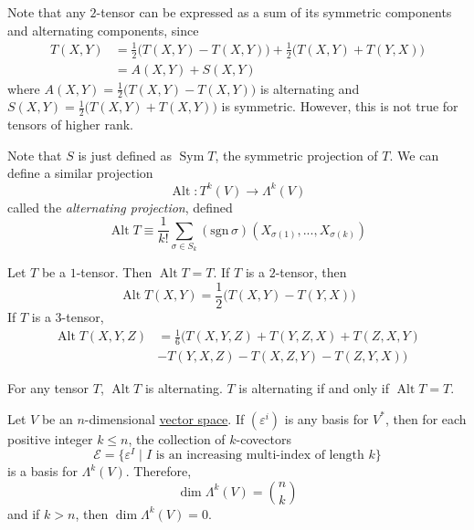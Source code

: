 \documentclass{article}
\DeclareMathOperator{\Sym}{Sym}
\DeclareMathOperator{\Alt}{Alt}
\newcounter{theorem}[section]
\newcounter{example}[section]
\begin{document}
    Note that any $2$-tensor can be expressed as a sum of its symmetric components and alternating components, since
    \begin{align*}
        T(X, Y) & = \frac{1}{2} \big( T(X, Y) - T(X, Y)\big) + \frac{1}{2} \big( T(X, Y) + T(Y, X) \big) \\
        & = A(X, Y) + S(X, Y)
    \end{align*}
    where $A(X, Y) = \frac{1}{2} \big( T(X, Y) - T(X, Y) \big)$ is alternating and $S (X, Y) = \frac{1}{2} \big( T(X, Y) + T(X, Y) \big)$ is symmetric. However, this is not true for tensors of higher rank. 

    Note that $S$ is just defined as $\Sym{T}$, the symmetric projection of $T$. We can define a similar projection 
    \begin{equation}
      \Alt: T^k (V) \to \Lambda^k (V)
    \end{equation}
    called the \textit{alternating projection}, defined
    \begin{equation}
      \Alt{T} \equiv \frac{1}{k!} \sum_{\sigma \in S_k} (\text{sgn}\,\sigma) (X_{\sigma(1)}, ..., X_{\sigma(k)})
    \end{equation}

    \begin{example}
      \label{ex:alternation-of-1-and-2-tensors}
    Let $T$ be a $1$-tensor. Then $\Alt{T} = T$. If $T$ is a $2$-tensor, then
    \begin{equation}
      \Alt{T(X, Y)} = \frac{1}{2} \big(T(X, Y) - T(Y, X) \big)
    \end{equation}
    If $T$ is a $3$-tensor, 
    \begin{align*}
        \Alt{T(X, Y, Z)} & = \frac{1}{6} \big( T(X, Y, Z) + T(Y, Z, X) + T(Z, X, Y) \\ & - T(Y, X, Z) - T(X, Z, Y) - T(Z, Y, X) \big)  
    \end{align*}
    \end{example}

    \begin{lemma}
      \label{thm:properties-of-the-alternating-projection}
    For any tensor $T$, $\Alt{T}$ is alternating. $T$ is alternating if and only if $\Alt{T} = T$. 
    \end{lemma}

    \begin{theorem}
      \label{thm:basis-for-the-space-of-alternating-tensors}
    Let $V$ be an $n$-dimensional \hyperref[lin-def:vector-space]{vector space}. If $(\varepsilon^i)$ is any basis for $V^*$, then for each positive integer $k \leq n$, the collection of $k$-covectors 
    \begin{equation}
      \mathcal{E} = \{\varepsilon^I \;|\; I \text{ is an increasing multi-index of length } k\}
    \end{equation}
    is a basis for $\Lambda^k (V)$. Therefore, 
      \begin{equation}
        \dim \Lambda^k (V) = \binom{n}{k}
      \end{equation}
    and if $k > n$, then $\dim{\Lambda^k (V)} = 0$. 
    \end{theorem}
\end{document}
